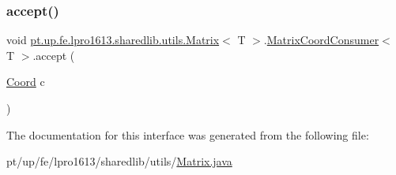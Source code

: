 \subsubsection{\texorpdfstring{accept()}{accept()}}
{\footnotesize\ttfamily void \hyperlink{classpt_1_1up_1_1fe_1_1lpro1613_1_1sharedlib_1_1utils_1_1_matrix}{pt.\+up.\+fe.\+lpro1613.\+sharedlib.\+utils.\+Matrix}$<$ T $>$.\hyperlink{interfacept_1_1up_1_1fe_1_1lpro1613_1_1sharedlib_1_1utils_1_1_matrix_1_1_matrix_coord_consumer}{Matrix\+Coord\+Consumer}$<$ T $>$.accept (\begin{DoxyParamCaption}\item[{\hyperlink{classpt_1_1up_1_1fe_1_1lpro1613_1_1sharedlib_1_1utils_1_1_coord}{Coord}}]{c }\end{DoxyParamCaption})}



The documentation for this interface was generated from the following file\+:\begin{DoxyCompactItemize}
\item 
pt/up/fe/lpro1613/sharedlib/utils/\hyperlink{_matrix_8java}{Matrix.\+java}\end{DoxyCompactItemize}
